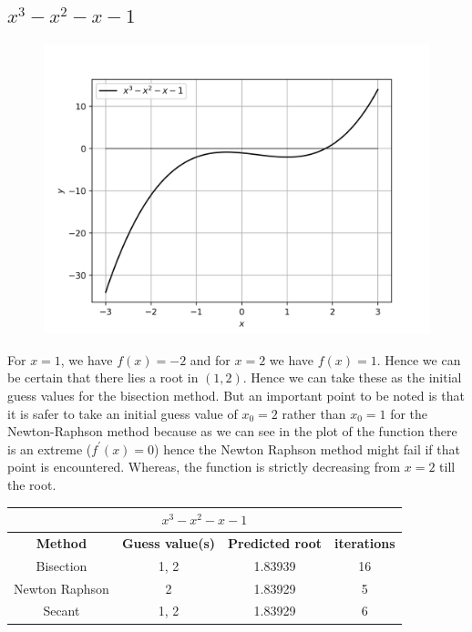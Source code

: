 \documentclass[12,a4paper]{article}
\begin{document}
    \subsection{$x^3 - x^2 - x - 1$}
    \begin{figure}[H]
        \centering
        \includegraphics[width = \textwidth]{plots/p2.png}
        \label{fig:my_label}
    \end{figure}
    For $x=1$, we have $f(x)=-2$ and for $x=2$ we have $f(x)=1$. Hence we can be certain that there lies a root in $(1,2)$. Hence we can take these as the initial guess values for the bisection method. But an important point to be noted is that it is safer to take an initial guess value of $x_0=2$ rather than $x_0=1$ for the Newton-Raphson method because as we can see in the plot of the function there is an extreme ($f^{'}(x)=0$) hence the Newton Raphson method might fail if that point is encountered. Whereas, the function is strictly decreasing from $x = 2$ till the root.
    \begin{table}[h!]
        \centering
        \begin{tabular}{|c|c c c|} 
            \hline
            \multicolumn{4}{|c|}{$x^3 - x^2 - x - 1$}\\
            \hline
            \textbf{Method}&\textbf{Guess value(s)}&\textbf{Predicted root}&\textbf{iterations} \\ [0.5ex] 
            \hline
            Bisection & 1, 2 & 1.83939 & 16 \\ 
            Newton Raphson & 2 & 1.83929 & 5 \\
            Secant & 1, 2 & 1.83929 & 6 \\[1ex] 
            \hline
        \end{tabular}
    \end{table}
\end{document}
